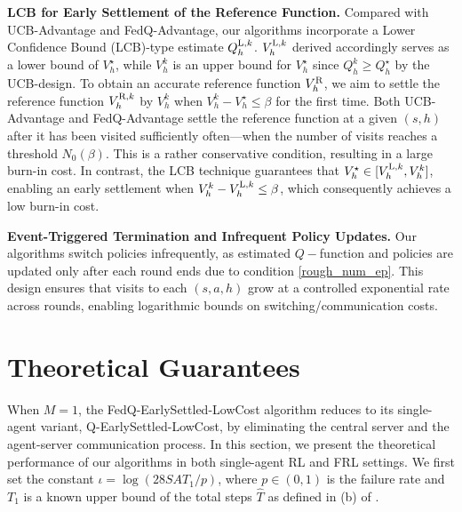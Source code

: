 \documentclass{article}
\newcommand{\LL}{\textnormal{L}}
\newcommand{\R}{\textnormal{R}}
\begin{document}
\textbf{LCB for Early Settlement of the Reference Function.} Compared with UCB-Advantage and FedQ-Advantage, our algorithms incorporate a Lower Confidence Bound (LCB)-type estimate \( Q_h^{\LL,k} \). \( V_h^{\LL,k} \) derived accordingly serves as a lower bound of \( V_h^{\star} \), while $V_h^k$ is an upper bound for \( V_h^{\star} \) since $Q_h^k \geq Q_h^{\star}$ by the UCB-design. To obtain an accurate reference function $V_h^{\R}$, we aim to settle the reference function \( V_h^{\R,k} \) by \( V_h^k \) when \( V_h^k - V_h^{\star} \leq \beta \) for the first time. Both UCB-Advantage and FedQ-Advantage settle the reference function at a given $(s,h)$ after it has been visited sufficiently often—when the number of visits reaches a threshold \( N_0(\beta) \). This is a rather conservative condition, resulting in a large burn-in cost. In contrast, the LCB technique guarantees that  \( V_h^{\star} \in [V_h^{\LL,k}, V_h^k]\), enabling an early settlement when \( V_h^{k} - V_h^{\LL,k} \leq \beta \), which consequently achieves a low burn-in cost.

\textbf{Event-Triggered Termination and Infrequent Policy Updates.} Our algorithms switch policies infrequently, as estimated $Q-$function and policies are updated only after each round ends due to condition \eqref{rough_num_ep}. This design ensures that visits to each \( (s,a,h) \) grow at a controlled exponential rate across rounds, enabling logarithmic bounds on switching/communication costs.


\section{Theoretical Guarantees}
\label{theoretical}
When $M = 1$, the FedQ-EarlySettled-LowCost algorithm reduces to its single-agent variant, Q-EarlySettled-LowCost, by eliminating the central server and the agent-server communication process. In this section, we present the theoretical performance of our algorithms in both single-agent RL and FRL settings. We first set the constant $\iota = \log ( 28SAT_1/p )$, where $p \in (0,1)$ is the failure rate and \( T_1 \) is a known upper bound of the total steps \( \hat{T} \) as defined in (b) of .
\end{document}
